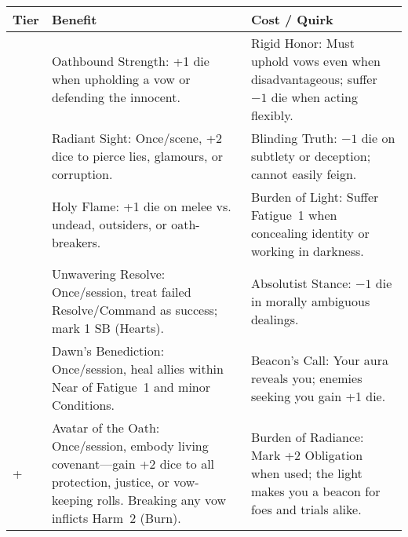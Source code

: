 \begin{longtable}{>{\raggedright\arraybackslash}p{1cm} p{5cm} p{5cm}}
\toprule
\textbf{Tier} & \textbf{Benefit} & \textbf{Cost / Quirk} \\
\midrule
1 & Oathbound Strength: +1 die when upholding a vow or defending the innocent. & Rigid Honor: Must uphold vows even when disadvantageous; suffer \(-1\) die when acting flexibly. \\
\midrule
2 & Radiant Sight: Once/scene, +2 dice to pierce lies, glamours, or corruption. & Blinding Truth: \(-1\) die on subtlety or deception; cannot easily feign. \\
\midrule
3 & Holy Flame: +1 die on melee vs. undead, outsiders, or oath-breakers. & Burden of Light: Suffer Fatigue~1 when concealing identity or working in darkness. \\
\midrule
4 & Unwavering Resolve: Once/session, treat failed Resolve/Command as success; mark 1 SB (Hearts). & Absolutist Stance: \(-1\) die in morally ambiguous dealings. \\
\midrule
5 & Dawn’s Benediction: Once/session, heal allies within Near of Fatigue~1 and minor Conditions. & Beacon’s Call: Your aura reveals you; enemies seeking you gain +1 die. \\
\midrule
6+ & Avatar of the Oath: Once/session, embody living covenant—gain +2 dice to all protection, justice, or vow-keeping rolls. Breaking any vow inflicts Harm~2 (Burn). & Burden of Radiance: Mark +2 Obligation when used; the light makes you a beacon for foes and trials alike. \\
\bottomrule
\end{longtable}